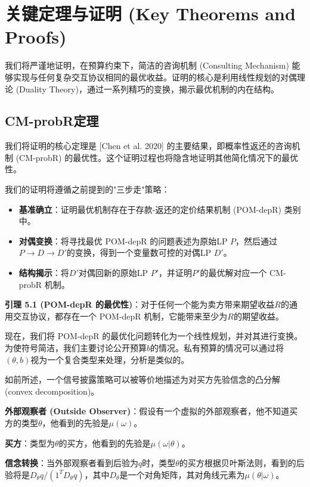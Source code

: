 \section{关键定理与证明 (Key Theorems and Proofs)}

我们将严谨地证明，在预算约束下，简洁的咨询机制 (Consulting Mechanism) 能够实现与任何复杂交互协议相同的最优收益。证明的核心是利用线性规划的对偶理论 (Duality Theory)，通过一系列精巧的变换，揭示最优机制的内在结构。

\subsection{CM-probR定理}

我们将证明的核心定理是 [Chen et al. 2020] 的主要结果，即概率性返还的咨询机制 (CM-probR) 的最优性。这个证明过程也将隐含地证明其他简化情况下的最优性。

我们的证明将遵循之前提到的"三步走"策略：

\begin{itemize}
    \item \textbf{基准确立}：证明最优机制存在于存款-返还的定价结果机制 (POM-depR) 类别中。
    \item \textbf{对偶变换}：将寻找最优 POM-depR 的问题表述为原始LP $P$，然后通过$P\to D\to D'$的变换，得到一个变量数可控的对偶LP $D'$。
    \item \textbf{结构揭示}：将$D'$对偶回新的原始LP $P'$，并证明$P'$的最优解对应一个 CM-probR 机制。
\end{itemize}

\textbf{引理 5.1 (POM-depR 的最优性)}：对于任何一个能为卖方带来期望收益$R$的通用交互协议，都存在一个 POM-depR 机制，它能带来至少为$R$的期望收益。

现在，我们将 POM-depR 的最优化问题转化为一个线性规划，并对其进行变换。为使符号简洁，我们主要讨论公开预算$b$的情况。私有预算的情况可以通过将$(\theta,b)$视为一个复合类型来处理，分析是类似的。

如前所述，一个信号披露策略可以被等价地描述为对买方先验信念的凸分解 (convex decomposition)。

\textbf{外部观察者 (Outside Observer)}：假设有一个虚拟的外部观察者，他不知道买方的类型$\theta$，他看到的先验是$\mu(\omega)$。

\textbf{买方}：类型为$\theta$的买方，他看到的先验是$\mu(\omega|\theta)$。

\textbf{信念转换}：当外部观察者看到后验为$q$时，类型$\theta$的买方根据贝叶斯法则，看到的后验将是$D_\theta q / (1^T D_\theta q)$，其中$D_\theta$是一个对角矩阵，其对角线元素为$\mu(\theta|\omega)$。

